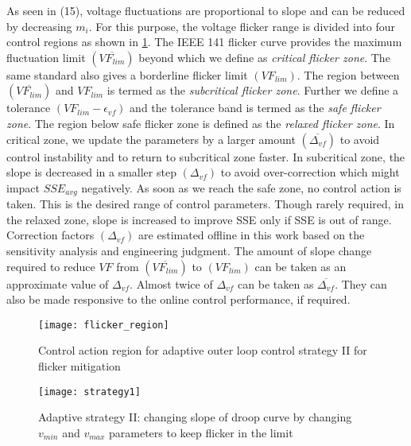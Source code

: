 \documentclass[journal]{IEEEtran}
\newcommand{\squeezeup}{\vspace{-2.5mm}}
\begin{document}
As seen in (15), voltage fluctuations are proportional to slope and can be reduced by decreasing $m_i$. For this purpose, the voltage flicker range is divided into four control regions as shown in \figurename \ref{fig:flicekr_region}. The IEEE 141 flicker curve provides the maximum fluctuation limit {\small $(\overline{VF_{lim}})$} beyond which we define as \textit{critical flicker zone}. The same standard also gives a borderline flicker limit {\small $(VF_{lim})$}. The region between {\small$(\overline{VF_{lim}})$} and $VF_{lim}$ is termed as the \textit{subcritical flicker zone}. Further we define a tolerance {\small $(VF_{lim}\!-\!\epsilon_{vf})$} and the tolerance band is termed as the \textit{safe flicker zone}. The region below safe flicker zone is defined as the \textit{relaxed flicker zone}. In critical zone, we update the parameters by a larger amount {\small$(\overline{\Delta_{vf}})$} to avoid control instability and to return to subcritical zone faster. In subcritical zone, the slope is decreased in a smaller step {\small$(\Delta_{vf})$} to avoid over-correction which might impact  {\small$SSE_{avg}$}  negatively. As soon as we reach the safe zone, no control action is taken. This is the desired range of control parameters. Though rarely required, in the relaxed zone, slope is increased to improve SSE only if SSE is out of range. Correction factors {\small$(\Delta_{vf})$} are estimated offline in this work based on the sensitivity analysis and engineering judgment. The amount of slope change required to reduce $VF$ from {\small$(\overline{VF_{lim}})$} to {\small$({VF_{lim}})$} can be taken as an approximate value of {\small$\Delta_{vf}$}. Almost twice of  {\small$\Delta_{vf}$} can be taken as {\small$\overline{\Delta_{vf}}$}. They can also be made responsive to the online control performance, if required.   
\begin{figure}[]
	\centering
	\texttt{[image: flicker\_region]}
    \caption {Control action region for adaptive outer loop control strategy II for flicker mitigation }
    \label{fig:flicekr_region}
    \vspace{-2mm}
\end{figure}
\begin{figure}[]
	\centering
	\texttt{[image: strategy1]}
    \caption {Adaptive strategy II: changing slope of droop curve by changing $v_{min}$ and $v_{max}$ parameters to keep flicker in the limit }
    \label{fig:strategy1}
    \squeezeup
\end{figure}
\end{document}
